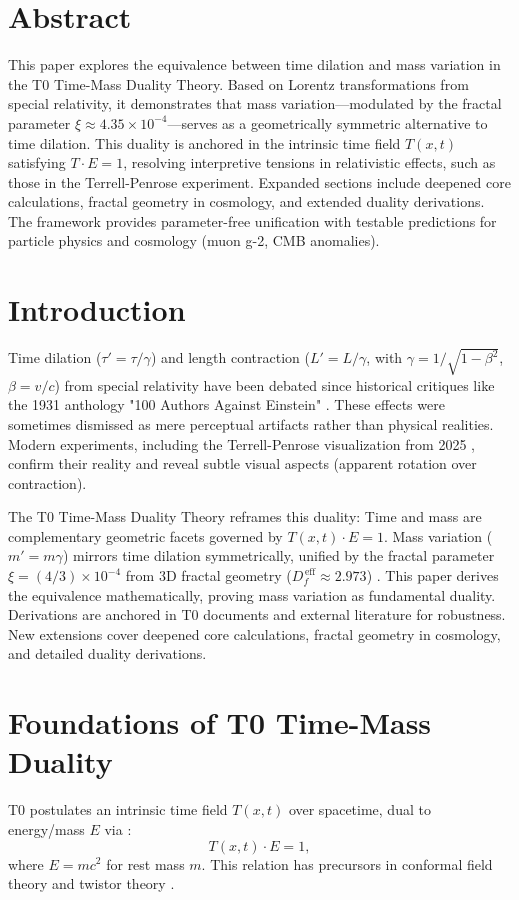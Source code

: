 \section*{Abstract}
		This paper explores the equivalence between time dilation and mass variation in the T0 Time-Mass Duality Theory. Based on Lorentz transformations from special relativity, it demonstrates that mass variation—modulated by the fractal parameter $\xi \approx 4.35 \times 10^{-4}$—serves as a geometrically symmetric alternative to time dilation. This duality is anchored in the intrinsic time field $T(x,t)$ satisfying $T \cdot E = 1$, resolving interpretive tensions in relativistic effects, such as those in the Terrell-Penrose experiment. Expanded sections include deepened core calculations, fractal geometry in cosmology, and extended duality derivations. The framework provides parameter-free unification with testable predictions for particle physics and cosmology (muon g-2, CMB anomalies).

	
	\section{Introduction}
	Time dilation ($\tau' = \tau / \gamma$) and length contraction ($L' = L / \gamma$, with $\gamma = 1 / \sqrt{1 - \beta^2}$, $\beta = v/c$) from special relativity have been debated since historical critiques like the 1931 anthology "100 Authors Against Einstein" \cite{hundert1931}. These effects were sometimes dismissed as mere perceptual artifacts rather than physical realities. Modern experiments, including the Terrell-Penrose visualization from 2025 \cite{terrell2025}, confirm their reality and reveal subtle visual aspects (apparent rotation over contraction).
	
	The T0 Time-Mass Duality Theory \cite{pascher2025t0} reframes this duality: Time and mass are complementary geometric facets governed by $T(x,t) \cdot E = 1$. Mass variation ($m' = m \gamma$) mirrors time dilation symmetrically, unified by the fractal parameter $\xi = (4/3) \times 10^{-4}$ from 3D fractal geometry ($D_f^{\,\text{eff}} \approx 2.973$) \cite{pascher2025si}. This paper derives the equivalence mathematically, proving mass variation as fundamental duality. Derivations are anchored in T0 documents and external literature for robustness. New extensions cover deepened core calculations, fractal geometry in cosmology, and detailed duality derivations.
	
	\section{Foundations of T0 Time-Mass Duality}
	T0 postulates an intrinsic time field $T(x,t)$ over spacetime, dual to energy/mass $E$ via \cite{pascher2025qm, penrose2004}:
	\begin{equation}
		T(x,t) \cdot E = 1,
	\end{equation}
	where $E = m c^2$ for rest mass $m$. This relation has precursors in conformal field theory \cite{francesco1997} and twistor theory \cite{penrose1967}.
	
